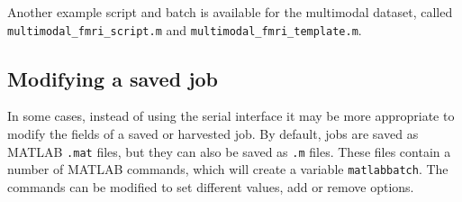 Another example script and batch is available for the multimodal
dataset, called \verb|multimodal_fmri_script.m| and
\verb|multimodal_fmri_template.m|.

\subsection{Modifying a saved job}

In some cases, instead of using the serial interface it may be more
appropriate to modify the fields of a saved or harvested job. By default, jobs
are saved as MATLAB \verb|.mat| files, but they can also be saved as
\verb|.m| files. These files contain a number of MATLAB commands,
which will create a variable \verb|matlabbatch|. The commands can be
modified to set different values, add or remove options. 
